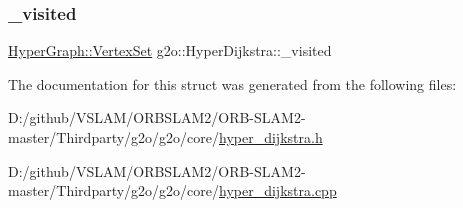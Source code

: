 \mbox{\label{structg2o_1_1_hyper_dijkstra_ad43cae6d9e1df2cf7db839f504ba6cc5}} 
\subsubsection{\texorpdfstring{\+\_\+visited}{\_visited}}
{\footnotesize\ttfamily \mbox{\hyperlink{classg2o_1_1_hyper_graph_a703938cdb4bb636860eed55a2489d70c}{Hyper\+Graph\+::\+Vertex\+Set}} g2o\+::\+Hyper\+Dijkstra\+::\+\_\+visited\hspace{0.3cm}{\ttfamily [protected]}}



The documentation for this struct was generated from the following files\+:\begin{DoxyCompactItemize}
\item 
D\+:/github/\+V\+S\+L\+A\+M/\+O\+R\+B\+S\+L\+A\+M2/\+O\+R\+B-\/\+S\+L\+A\+M2-\/master/\+Thirdparty/g2o/g2o/core/\mbox{\hyperlink{hyper__dijkstra_8h}{hyper\+\_\+dijkstra.\+h}}\item 
D\+:/github/\+V\+S\+L\+A\+M/\+O\+R\+B\+S\+L\+A\+M2/\+O\+R\+B-\/\+S\+L\+A\+M2-\/master/\+Thirdparty/g2o/g2o/core/\mbox{\hyperlink{hyper__dijkstra_8cpp}{hyper\+\_\+dijkstra.\+cpp}}\end{DoxyCompactItemize}
